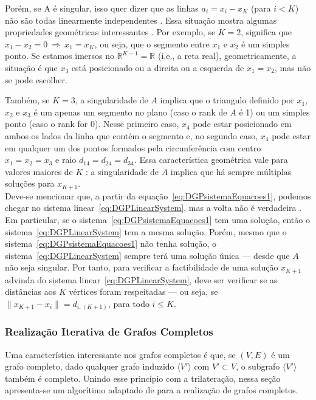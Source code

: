 Porém, se A é singular, isso quer dizer que as linhas $a_i = x_i - x_K$ (para $i<K$) não são todas linearmente independentes \cite{AlgebraLinearElon}. Essa situação mostra algumas propriedades geométricas interessantes \cite{libertiEDG}. Por exemplo, se $K=2$, significa que $x_1 - x_2 = 0 \ \Rightarrow \  x_1 = x_K$, ou seja, que o segmento entre $x_1$ e $x_2$ é um simples ponto. Se estamos imersos no $\mathbb{R}^{K-1} = \mathbb{R}$ (i.e., a reta real), geometricamente, a situação é que $x_3$ está posicionado ou a direita ou a esquerda de $x_1 = x_2$, mas não se pode escolher.

Também, se $K = 3$, a singularidade de $A$ implica que o triangulo definido por $x_1$, $x_2$ e $x_3$ é um apenas um segmento no plano (caso o rank de $A$ é 1) ou um simples ponto (caso o rank for 0). Nesse primeiro caso, $x_4$ pode estar posicionado em ambos os lados da linha que contém o segmento e, no segundo caso, $x_4$ pode estar em qualquer um dos pontos formados pela circunferência com centro $x_1 = x_2 = x_3$ e raio $d_{14} = d_{24} = d_{34}$. Essa característica geométrica vale para valores maiores de $K$ \cite{libertiEDG}: a singularidade de $A$ implica que há sempre múltiplas soluções para $x_{K+1}$.\\

Deve-se mencionar que, a partir da equação~\ref{eq:DGPsistemaEquacoes1}, podemos chegar no sistema linear~\ref{eq:DGPLinearSystem}, mas a volta não é verdadeira \cite{libertiEDG}. Em particular, se o sistema~\ref{eq:DGPsistemaEquacoes1} tem uma solução, então o sistema~\ref{eq:DGPLinearSystem} tem a mesma solução. Porém, mesmo que o sistema~\ref{eq:DGPsistemaEquacoes1} não tenha solução, o sistema~\ref{eq:DGPLinearSystem} sempre terá uma solução única --- desde que $A$ não seja singular. Por tanto, para verificar a factibilidade de uma solução $x_{K+1}$ advinda do sistema linear~\ref{eq:DGPLinearSystem}, deve ser verificar se as distâncias aos $K$ vértices foram respeitadas --- ou seja, se $\lVert x_{K+1} - x_i\rVert = d_{i,(K+1)}$, para todo $i\leq K$. 

\subsubsection{Realização Iterativa de Grafos Completos}

Uma característica interessante nos grafos completos é que, se $(V,E)$ é um grafo completo, dado qualquer grafo induzido $\langle V'\rangle$ com $V'\subset V$, o subgrafo $\langle V' \rangle$ também é completo. Unindo esse princípio com a trilateração, nessa seção apresenta-se um algorítimo adaptado de \cite{libertiEDG} para a realização de grafos completos.\\

